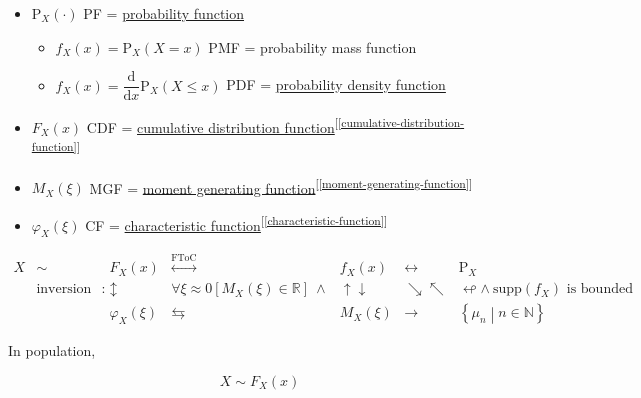 \documentclass[
]{book}
\providecommand{\tightlist}{%
  \setlength{\itemsep}{0pt}\setlength{\parskip}{0pt}}
\theoremstyle{definition}
\theoremstyle{definition}
\theoremstyle{definition}
\theoremstyle{definition}
\theoremstyle{remark}
\begin{document}
\begin{itemize}
\tightlist
\item
  \(\mathrm{P}_{{\scriptscriptstyle X}}\left(\cdot\right)\) PF = \hyperref[probability-function]{probability function}

  \begin{itemize}
  \tightlist
  \item
    \(f_{{\scriptscriptstyle X}}\left(x\right)=\mathrm{P}_{{\scriptscriptstyle X}}\left(X=x\right)\) PMF = probability mass function
  \item
    \(f_{{\scriptscriptstyle X}}\left(x\right)=\dfrac{\mathrm{d}}{\mathrm{d}x}\mathrm{P}_{{\scriptscriptstyle X}}\left(X\le x\right)\) PDF = \hyperref[probability-density-function]{probability density function}
  \end{itemize}
\item
  \(F_{{\scriptscriptstyle X}}\left(x\right)\) CDF = \hyperref[cumulative-distribution-function]{cumulative distribution function}\textsuperscript{{[}\ref{cumulative-distribution-function}{]}}
\item
  \(M_{{\scriptscriptstyle X}}\left(\xi\right)\) MGF = \hyperref[moment-generating-function]{moment generating function}\textsuperscript{{[}\ref{moment-generating-function}{]}}
\item
  \(\varphi_{{\scriptscriptstyle X}}\left(\xi\right)\) CF = \hyperref[characteristic-function]{characteristic function}\textsuperscript{{[}\ref{characteristic-function}{]}}
\end{itemize}

\[
\begin{array}{ccccccc}
X & \sim & F_{{\scriptscriptstyle X}}\left(x\right) & \overset{\text{FToC}}{\longleftrightarrow} & f_{{\scriptscriptstyle X}}\left(x\right) & \leftrightarrow & \mathrm{P}_{{\scriptscriptstyle X}}\\
 & \text{inversion formula}\ : & \updownarrow & \forall\xi\approx0\left[M_{{\scriptscriptstyle X}}\left(\xi\right)\in\mathbb{R}\right]\ \wedge & \uparrow\downarrow & \searrow\nwarrow & \looparrowleft\wedge\ \mathrm{supp}\left(f_{{\scriptscriptstyle X}}\right)\text{ is bounded}\\
 &  & \varphi_{{\scriptscriptstyle X}}\left(\xi\right) & \leftrightarrows & M_{{\scriptscriptstyle X}}\left(\xi\right) & \rightarrow & \left\{ \mu_{{\scriptscriptstyle n}}\middle|n\in\mathbb{N}\right\} 
\end{array}
\]

In population,

\[
X\sim F_{{\scriptscriptstyle X}}\left(x\right)
\]
\end{document}
